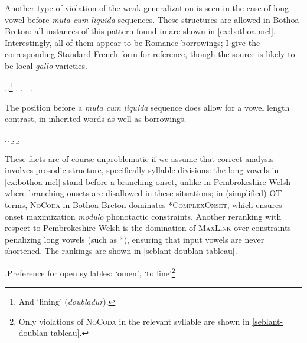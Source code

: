 Another type of violation of the weak generalization is seen in the case of long vowel before \emph{muta cum liquida} sequences. These structures are allowed in Bothoa Breton: all instances of this pattern found in \citet{humphreys95:_phonol_bothoa_saint_nicol_pelem} are shown in \cref{ex:bothoa-mcl}. Interestingly, all of them appear to be Romance borrowings; I give the corresponding Standard French form for reference, though the source is likely to be local \emph{gallo} varieties.

\ex.\label{ex:bothoa-mcl}\a.\footnote{And \ipa{[ˌduːˈbladər]} `lining' (\emph{doubladur}).}
\b.
\b.
\b.
\b.
\b.


The position before a \emph{muta cum liquida} sequence does allow for a vowel length contrast, in inherited words as well as borrowings.

\ex.\a.
\b.
\b.


These facts are of course unproblematic if we assume that correct analysis involves prosodic structure, specifically syllable divisions: the long vowels in \cref{ex:bothoa-mcl} stand before a branching onset, unlike in Pembrokeshire Welsh where branching onsets are disallowed in these situations; in (simplified) OT terms, \textsc{NoCoda} in Bothoa Breton dominates *\textsc{Complex\hspace{0pt}Onset}, which ensures onset maximization \emph{modulo} phonotactic constraints. Another reranking with respect to Pembrokeshire Welsh is the domination of \textsc{MaxLink}-\mo[V] over constraints penalizing long vowels (such as *\mo\mo), ensuring that input vowels are never shortened. The rankings are shown in \ref{seblant-doublan-tableau}.

\ex.\label{seblant-doublan-tableau}Preference for open syllables: \ipa{[ˈzɛbland̥]} `omen', \ipa{[ˈduːblo]} `to line'\footnote{Only violations of \textsc{NoCoda} in the relevant syllable are shown in \ref{seblant-doublan-tableau}.}\\



